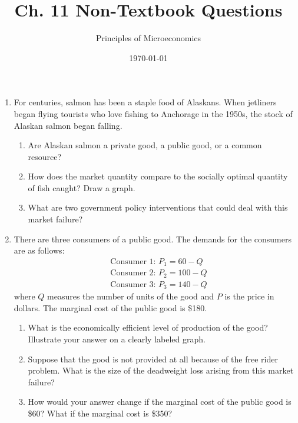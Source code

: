 \documentclass{article}
\title{Ch. 11 Non-Textbook Questions}
\author{Principles of Microeconomics}
\date{\today}
\begin{document}
\maketitle

\begin{enumerate}
	
\item For centuries, salmon has been a staple food of Alaskans. When jetliners began flying tourists who love fishing to Anchorage in the 1950s, the stock of Alaskan salmon began falling. 

	\begin{enumerate}
	
	\item Are Alaskan salmon a private good, a public good, or a common resource?
	
	\item How does the market quantity compare to the socially optimal quantity of fish caught? Draw a graph.
	
	\item What are two government policy interventions that could deal with this market failure? 
	
	\end{enumerate}
	
\item There are three consumers of a public good. The demands for the consumers are as follows:
	\begin{align*}
	&\text{Consumer 1: } P_1 = 60 - Q \\
	&\text{Consumer 2: } P_2 = 100 - Q \\
	&\text{Consumer 3: } P_3 = 140 - Q
	\end{align*}
	where $Q$ measures the number of units of the good and $P$ is the price in dollars. The marginal cost of the public good is \$180.
	\begin{enumerate}
	
	\item What is the economically efficient level of production of the good? Illustrate your answer on a clearly labeled graph.
	
	\item Suppose that the good is not provided at all because of the free rider problem. What is the size of the deadweight loss arising from this market failure?
	
	\item How would your answer change if the marginal cost of the public good is \$60? What if the marginal cost is \$350?
	

\end{enumerate}
\end{enumerate}
\end{document}
